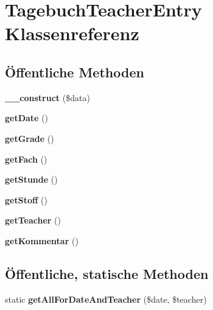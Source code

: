 \hypertarget{class_tagebuch_teacher_entry}{}\section{Tagebuch\+Teacher\+Entry Klassenreferenz}
\label{class_tagebuch_teacher_entry}
\subsection*{Öffentliche Methoden}
\begin{DoxyCompactItemize}
\item 
\mbox{\label{class_tagebuch_teacher_entry_a99a330752e0c7f326a8640d7be923cfa}} 
{\bfseries \+\_\+\+\_\+construct} (\$data)
\item 
\mbox{\label{class_tagebuch_teacher_entry_a337661bfb9e0abe4e632f9da6deac40b}} 
{\bfseries get\+Date} ()
\item 
\mbox{\label{class_tagebuch_teacher_entry_a3be30b54dc1f6ffb4949c38f096bffb2}} 
{\bfseries get\+Grade} ()
\item 
\mbox{\label{class_tagebuch_teacher_entry_ab2b4abfa3c788153d25072b665cebc88}} 
{\bfseries get\+Fach} ()
\item 
\mbox{\label{class_tagebuch_teacher_entry_a06eb9c2634c013dd08232a7d79ed339a}} 
{\bfseries get\+Stunde} ()
\item 
\mbox{\label{class_tagebuch_teacher_entry_ae65981d2267171151981c7c6466ed794}} 
{\bfseries get\+Stoff} ()
\item 
\mbox{\label{class_tagebuch_teacher_entry_a898a11b565bd7ad981e9445e05645abc}} 
{\bfseries get\+Teacher} ()
\item 
\mbox{\label{class_tagebuch_teacher_entry_a92b550b86e47a1d1d171d41d3a7e01dd}} 
{\bfseries get\+Kommentar} ()
\end{DoxyCompactItemize}
\subsection*{Öffentliche, statische Methoden}
\begin{DoxyCompactItemize}
\item 
\mbox{\label{class_tagebuch_teacher_entry_a0964ae1ba2d0db8a22a41ae88db7791a}} 
static {\bfseries get\+All\+For\+Date\+And\+Teacher} (\$date, \$teacher)
\end{DoxyCompactItemize}


